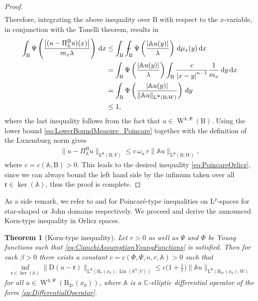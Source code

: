 \documentclass[a4paper,10pt,reqno,oneside]{amsart}
\numberwithin{equation}{section}
\newcommand{\R}{\mathbb R}
\newcommand{\C}{\mathbb C}
\newcommand{\ball}{\mathrm{B}}
\newcommand{\A}{\mathscr{A}}
\newcommand{\Aop}{\mathbb{A}}
\newcommand{\sobo}{\operatorname{W}}
\newcommand{\D}{\mathrm{D}}
\DeclareMathOperator{\Lin}{Lin}
\newcommand{\dx}[1]{\,\mathrm{d}#1}
\newcommand{\abs}[1]{\left\lvert#1\right\rvert}
\newcommand{\rfrak}{\mathfrak{r}}
\renewcommand{\L}{\mathrm{L}}
\def\Xint#1{\mathchoice
	{\XXint\displaystyle\textstyle{#1}}%
	{\XXint\textstyle\scriptstyle{#1}}%
	{\XXint\scriptstyle\scriptscriptstyle{#1}}%
	{\XXint\scriptscriptstyle\scriptscriptstyle{#1}}%
	\!\int}
\def\XXint#1#2#3{{\setbox0=\hbox{$#1{#2#3}{\int}$ }
		\vcenter{\hbox{$#2#3$ }}\kern-.6\wd0}}
\def\dashint{\Xint-}
\newtheorem{thm}{Theorem}[section]
\begin{document}
\begin{proof}
\begin{align*}
	\end{align*}
	Therefore, integrating the above inequality over $\ball$ with respect to the $x$-variable, in conjunction with the Tonelli theorem, results in 
	\begin{align*}
		\int_\ball \Psi\left(\frac{\abs{(u-\Pi^\ball_{\Aop} u)(x)}}{m_x\lambda}\right) \dx{x} 
		&\leq \int_\ball\,\dashint_\ball \Psi\left(\frac{\abs{\Aop u(y)}}{\lambda}\right) \dx{\mu_x(y)}\dx{x}\\
		&= \int_\ball  \Psi\left(\frac{\abs{\Aop u(y)}}{\lambda}\right)\int_\ball\frac{c}{\abs{x-y}^{n-1}}\frac{1}{m_x}\dx{y}\dx{x}\\
		&= \int_\ball \Psi\left(\frac{\abs{\Aop u(y)}}{\|\Aop u\|_{\L^{\Psi}(\ball;W)}}\right)\dx{y}\\
		&\leq 1,
	\end{align*}
	where the last inequality follows from the fact that $u\in\sobo^{\Aop,\Psi}(\ball)$. Using the lower bound \eqref{eq:LowerBoundMeasure_Poincare} together with the definition of the Luxemburg norm gives 
	\begin{align}\label{eq:Poincare_Projection}
		\|u-\Pi^\ball_{\Aop} u\|_{\L^\Psi(\ball;V)} \leq c\, \omega_n\, r \|\Aop u\|_{\L^\Psi(\ball;W)}, 
	\end{align}
	where $c=c(\Aop,\ball)>0$. This leads to the desired inequality \eqref{eq:PoincareOrlicz}, since we can always bound the left hand side by the infimum taken over all $\rfrak\in\ker(\Aop)$, thus the proof is complete.
	\end{proof}
As a side remark, we refer to \cite[Proposition 4.2]{GmRa1} and \cite[Proposition 3.7]{DieningGmeineder} for Poincar\'e-type inequalities on $\L^p$-spaces for star-shaped or John domains respectively. We proceed and derive the announced Korn-type inequality in Orlicz spaces. 
\begin{thm}[Korn-type inequality]
	Let $r>0$ as well as $\Psi$ and $\Phi$ be Young functions such that \eqref{eq:CianchiAssumptionYoungFunctions} is satisfied. Then for each $\beta>0$ there exists a constant $c=c(\Phi,\Psi,n,r,\Aop)>0$ such that 
	\begin{align}\label{eq:KornType2_Orlicz}
		\inf_{\rfrak\in\ker(\Aop)} \|\D (u-\rfrak)\|_{\L^\Phi(\ball_r(x_0);\Lin(\R^n;V))}\leq c \bigg(1+\frac{1}{r}\bigg)\|\Aop u \|_{\L^\Psi(\ball_{2r}(x_0);W)}
	\end{align}
	for all $u\in\sobo^{\Aop,\Psi}(\ball_{2r}(x_0))$, where $\Aop$ is a  $\C$-elliptic differential operator of the form \eqref{eq:DifferentialOperator}.
\end{thm}
\end{document}
